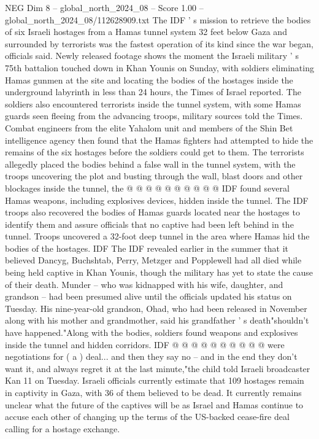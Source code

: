 \begin{textsample}{NEG Dim 8 – global\_north\_2024\_08 – Score 1.00 – global\_north\_2024\_08/112628909.txt}  \label{ex:f8_neg_427}
The IDF ' s mission to retrieve the bodies of six Israeli hostages from a Hamas tunnel system 32 feet below Gaza and surrounded by terrorists was the fastest operation of its kind since the war began, officials said.
Newly released footage shows the moment the Israeli military ' s 75th battalion touched down in Khan Younis on Sunday, with soldiers eliminating Hamas gunmen at the site and locating the bodies of the hostages inside the underground labyrinth in less than 24 hours, the Times of Israel reported.
The soldiers also encountered terrorists inside the tunnel system, with some Hamas guards seen fleeing from the advancing troops, military sources told the Times.
Combat engineers from the elite Yahalom unit and members of the Shin Bet intelligence agency then found that the Hamas fighters had attempted to hide the remains of the six hostages before the soldiers could get to them.
The terrorists allegedly placed the bodies behind a false wall in the tunnel system, with the troops uncovering the plot and busting through the wall, blast doors and other blockages inside the tunnel, the @ @ @ @ @ @ @ @ @ @ IDF found several Hamas weapons, including explosives devices, hidden inside the tunnel.
The IDF troops also recovered the bodies of Hamas guards located near the hostages to identify them and assure officials that no captive had been left behind in the tunnel.
Troops uncovered a 32-foot deep tunnel in the area where Hamas hid the bodies of the hostages.
IDF The IDF revealed earlier in the summer that it believed Dancyg, Buchshtab, Perry, Metzger and Popplewell had all died while being held captive in Khan Younis, though the military has yet to state the cause of their death.
Munder -- who was kidnapped with his wife, daughter, and grandson -- had been presumed alive until the officials updated his status on Tuesday.
His nine-year-old grandson, Ohad, who had been released in November along with his mother and grandmother, said his grandfather ' s death"shouldn't have happened."Along with the bodies, soldiers found weapons and explosives inside the tunnel and hidden corridors.
IDF @ @ @ @ @ @ @ @ @ @ were negotiations for ( a ) deal... and then they say no -- and in the end they don't want it, and always regret it at the last minute,"the child told Israeli broadcaster Kan 11 on Tuesday.
Israeli officials currently estimate that 109 hostages remain in captivity in Gaza, with 36 of them believed to be dead.
It currently remains unclear what the future of the captives will be as Israel and Hamas continue to accuse each other of changing up the terms of the US-backed cease-fire deal calling for a hostage exchange.

\end{textsample}
